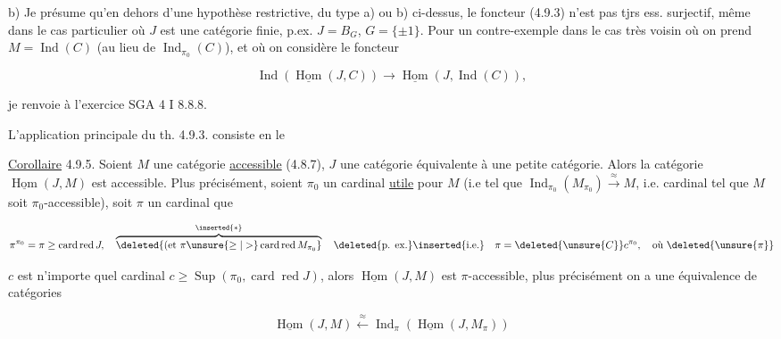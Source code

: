 
b) Je présume qu'en dehors d'une hypothèse restrictive, du type a) ou b) ci-dessus, le foncteur  (4.9.3) n'est pas tjrs ess. surjectif, même dans le cas particulier où $J$ est une catégorie finie, p.ex. $J=B_G$, $G=\{\pm1\}$. Pour un contre-exemple dans le cas très voisin où on prend $M=\operatorname{Ind}(C)$ (au lieu de $\operatorname{Ind}_{\pi_0}(C)$), et où on considère le foncteur 

\[
\operatorname{Ind}(\underline{\operatorname{Hom}}(J,C))\longrightarrow\underline{\operatorname{Hom}}(J,\operatorname{Ind}(C)),
\]

je renvoie à l'exercice SGA 4 I 8.8.8.

 L'application principale du th. 4.9.3. consiste en le

\uline{Corollaire} 4.9.5. Soient $M$ une catégorie \uline{accessible} (4.8.7), $J$ une catégorie équivalente à une petite catégorie. Alors la catégorie  $\underline{\operatorname{Hom}}(J,M)$ est accessible. Plus précisément, soient $\pi_0$ un cardinal \uline{utile} pour $M$ (i.e tel que $\operatorname{Ind}_{\pi_0}(M_{\pi_0})\xrightarrow{\approx} M$,   i.e.  cardinal tel que $M$ soit $\pi_0$-accessible), soit $\pi$ un cardinal   que

\[
\pi^{\pi_0}=\pi\geq\operatorname{card}\operatorname{red}J,\quad\overbrace{\deleted{\text{(et }\pi\unsure{\geq|>}\operatorname{card}\operatorname{red} M_{\pi_0}}}^{\inserted{\ast}}\quad\deleted{\text{p. ex.}}\inserted{\text{i.e.}}\quad\pi=\deleted{\unsure{C}}c^{\pi_0},\quad\text{où }\deleted{\unsure{\pi}}
\]


 $c$ est n'importe quel cardinal $c\geq\operatorname{Sup}(\pi_0,\operatorname{card}\operatorname{red}J)$, alors $\underline{\operatorname{Hom}}(J,M)$ est $\pi$-accessible, plus précisément on a une équivalence de catégories

\[
\underline{\operatorname{Hom}}(J,M)\xleftarrow{\approx}\operatorname{Ind}_{\pi}(\underline{\operatorname{Hom}}(J,M_{\pi}))\tag*{(4.9.5.1)}
\]
